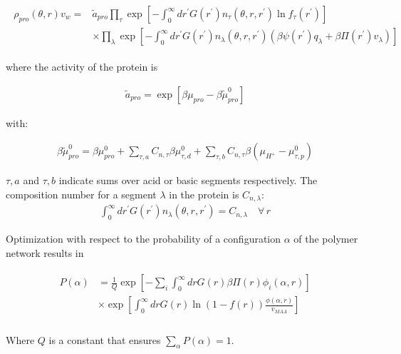 \documentclass[journal=jacsat,manuscript=suppinfo]{achemso}
\begin{document}
	
	
	\begin{align}
		\begin{aligned}
			\rho_{pro}(\theta, r)v_w = & \tilde{a}_{pro} \prod_\tau \exp\left[ -\int_0^\infty dr^\prime G(r^\prime) n_\tau(\theta,r,r^\prime) \ln f_\tau(r^\prime)\right] \\
			& \times \prod_\lambda \exp\left[ -\int_0^\infty dr^\prime G(r^\prime) n_\lambda(\theta,r,r^\prime)\left( \beta\psi(r^\prime) q_\lambda + \beta \Pi(r^\prime) v_\lambda \right)\right]
		\end{aligned}
		\label{eq:si:rho-pro}
	\end{align}
	
	\noindent where the activity of the protein is
	
	\begin{align}
		\tilde{a}_{pro} = \exp[\beta\mu_{pro} - \beta\tilde{\mu}^0_{pro}]
	\end{align}
	
	with:
	
	\begin{align}
		\beta\tilde{\mu}^0_{pro} =  \beta \mu^0_{pro}  + \sum_{\tau,a} C_{n,\tau}\beta\mu^0_{\tau,d} 
		+ \sum_{\tau,b} C_{n,\tau}\beta(\mu_{H^+} - \mu^0_{\tau,p})
	\end{align}
	
	
	\noindent $\tau,a$ and $\tau,b$ indicate sums over acid or basic segments respectively.
	The composition number for a segment $\lambda$ in the protein is $C_{n,\lambda}$:
	\begin{align}
		\int_0^\infty dr^\prime G(r^\prime) n_\lambda(\theta,r,r^\prime) = C_{n,\lambda}\quad \forall \, r
		\label{si:eq:composition}
	\end{align}
	
	
	Optimization with respect to the probability of a configuration $\alpha$ of the polymer network  results in
	
	\begin{align}
		\begin{aligned}
			P(\alpha)&=\frac{1}{Q}\exp\left[- \sum_i{\int_0^\infty{drG(r)\beta\Pi(r)\phi_i(\alpha,r)}}\right] \\
			& \times \exp\left[\int_0^\infty{ drG(r)\ln(1-f(r))\frac{\phi(\alpha,r)}{v_{MAA}}}\right] \\
		\end{aligned}
		\label{eq:si:proba-alfa}
	\end{align}
	
	\noindent Where $Q$ is a constant that ensures $\sum_\alpha P(\alpha) = 1$.
	
\end{document}
